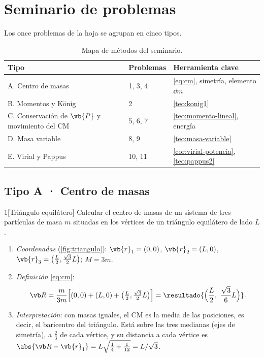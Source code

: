 \section{Seminario de problemas}
\label{sec:seminario}

Los once problemas de la hoja se agrupan en cinco tipos.

\begin{table}[ht]
\centering
\caption{Mapa de métodos del seminario.}
\label{tab:mapa}
\small
\begin{tabular}{@{}l l l@{}}
\toprule
\color{cian}Tipo & \color{cian}Problemas & \color{cian}Herramienta clave\\
\midrule
A. Centro de masas & 1, 3, 4 & \eqref{eq:cm}, simetría, elemento $\dd m$\\
B. Momentos y König & 2 & \cref{teo:konig1}\\
C. Conservación de $\vb{P}$ y movimiento del CM & 5, 6, 7 & \cref{teo:momento-lineal}, energía\\
D. Masa variable & 8, 9 & \cref{teo:masa-variable}\\
E. Virial y Pappus & 10, 11 & \cref{cor:virial-potencia}, \cref{teo:pappus2}\\
\bottomrule
\end{tabular}
\end{table}

\subsection{Tipo A · Centro de masas}

\begin{problema}{1}[Triángulo equilátero]
\label{prob:1}
Calcular el centro de masas de un sistema de tres partículas de masa $m$
situadas en los vértices de un triángulo equilátero de lado $L$.
\end{problema}

\begin{resolucion}
\begin{enumerate}
  \item \emph{Coordenadas} (\cref{fig:triangulo}):
  $\vb{r}_{1}=(0,0)$, $\vb{r}_{2}=(L,0)$, $\vb{r}_{3}=\bigl(\tfrac L2,\tfrac{\sqrt3}{2}L\bigr)$; $M=3m$.
  \item \emph{Definición} \eqref{eq:cm}:
  \[
    \Rc=\frac{m}{3m}\Bigl[(0,0)+(L,0)+\bigl(\tfrac L2,\tfrac{\sqrt3}{2}L\bigr)\Bigr]
    =\resultado{\Bigl(\frac L2,\ \frac{\sqrt3}{6}L\Bigr)} .
  \]
  \item \emph{Interpretación}: con masas iguales, el CM es la media de las
  posiciones, es decir, el baricentro del triángulo. Está sobre las tres
  medianas (ejes de simetría), a $\tfrac23$ de cada vértice, y su distancia a cada
  vértice es $\abs{\Rc-\vb{r}_{1}}=L\sqrt{\tfrac14+\tfrac1{12}}=L/\sqrt3$.\qedhere
\end{enumerate}
\end{resolucion}

